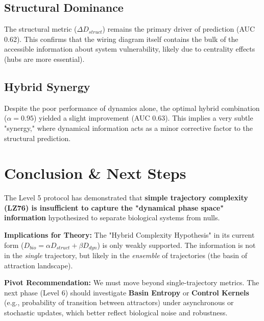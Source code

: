 \documentclass{article}
\begin{document}
\subsection{Structural Dominance}
The structural metric ($\Delta D_{struct}$) remains the primary driver of prediction (AUC 0.62). This confirms that the wiring diagram itself contains the bulk of the accessible information about system vulnerability, likely due to centrality effects (hubs are more essential).

\subsection{Hybrid Synergy}
Despite the poor performance of dynamics alone, the optimal hybrid combination ($\alpha=0.95$) yielded a slight improvement (AUC 0.63). This implies a very subtle "synergy," where dynamical information acts as a minor corrective factor to the structural prediction.

\section{Conclusion \& Next Steps}
The Level 5 protocol has demonstrated that \textbf{simple trajectory complexity (LZ76) is insufficient to capture the "dynamical phase space" information} hypothesized to separate biological systems from nulls.

\textbf{Implications for Theory:}
The "Hybrid Complexity Hypothesis" in its current form ($D_{bio} = \alpha D_{struct} + \beta D_{dyn}$) is only weakly supported. The information is not in the \textit{single} trajectory, but likely in the \textit{ensemble} of trajectories (the basin of attraction landscape).

\textbf{Pivot Recommendation:}
We must move beyond single-trajectory metrics. The next phase (Level 6) should investigate \textbf{Basin Entropy} or \textbf{Control Kernels} (e.g., probability of transition between attractors) under asynchronous or stochastic updates, which better reflect biological noise and robustness.
\end{document}
